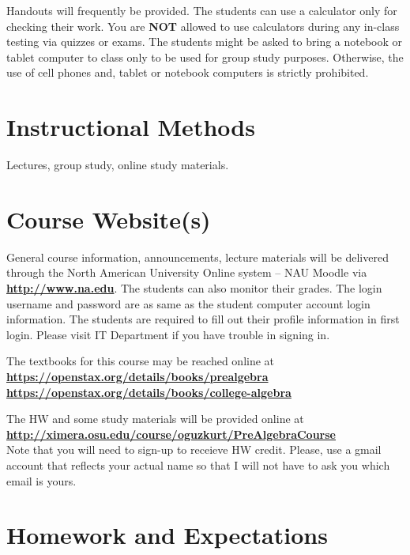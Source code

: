 \documentclass[handout]{ximera}
\begin{document}
Handouts will frequently be provided. The students can use a calculator only for checking their work. You are {\bf NOT} allowed to use calculators during any in-class testing via quizzes or exams.  The students might be asked to bring a notebook or tablet computer to class only to be used for group study purposes. Otherwise, the use of cell phones and, tablet or notebook computers is strictly prohibited. 

\section*{Instructional Methods}

Lectures, group study, online study materials.

\section*{Course Website(s)}

General course information, announcements, lecture materials will be delivered through the North American University Online system – NAU Moodle via \href{http://www.na.edu}{\bf http://www.na.edu}. The students can also monitor their grades. The login username and password are as same as the student computer account login information. The students are required to fill out their profile information in first login. Please visit IT Department if you have trouble in signing in.

The textbooks for this course may be reached online at 
\\ 
\href{https://openstax.org/details/books/prealgebra}{\bf https://openstax.org/details/books/prealgebra}
\\ 
\href{https://openstax.org/details/books/college-algebra}{\bf https://openstax.org/details/books/college-algebra}

The HW and some study materials will be provided online at 
\\ 
\href{http://ximera.osu.edu/course/oguzkurt/PreAlgebraCourse}{\bf http://ximera.osu.edu/course/oguzkurt/PreAlgebraCourse} 
\\
Note that you will need to sign-up to receieve HW credit. Please, use a gmail account that reflects your actual name so that I will not have to ask you which email is yours.

\section*{Homework and Expectations}
\end{document}
